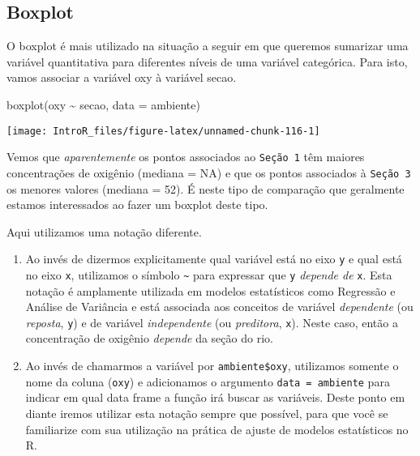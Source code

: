 \documentclass[
]{book}
\newenvironment{Shaded}{\begin{snugshade}}{\end{snugshade}}
\newcommand{\AttributeTok}[1]{\textcolor[rgb]{0.77,0.63,0.00}{#1}}
\newcommand{\FunctionTok}[1]{\textcolor[rgb]{0.00,0.00,0.00}{#1}}
\newcommand{\NormalTok}[1]{#1}
\newcommand{\SpecialCharTok}[1]{\textcolor[rgb]{0.00,0.00,0.00}{#1}}
\begin{document}
\hypertarget{boxplot-1}{%
\subsection{Boxplot}\label{boxplot-1}}

O boxplot é mais utilizado na situação a seguir em que queremos sumarizar uma variável quantitativa para diferentes níveis de uma variável categórica. Para isto, vamos associar a variável oxy à variável secao.

\begin{Shaded}
\begin{Highlighting}[]
\FunctionTok{boxplot}\NormalTok{(oxy }\SpecialCharTok{\textasciitilde{}}\NormalTok{ secao, }\AttributeTok{data =}\NormalTok{ ambiente)}
\end{Highlighting}
\end{Shaded}

\begin{center}\texttt{[image: IntroR\_files/figure-latex/unnamed-chunk-116-1]} \end{center}

Vemos que \emph{aparentemente} os pontos associados ao \texttt{Seção\ 1} têm maiores concentrações de oxigênio (mediana = NA) e que os pontos associados à \texttt{Seção\ 3} os menores valores (mediana = 52). É neste tipo de comparação que geralmente estamos interessados ao fazer um boxplot deste tipo.

Aqui utilizamos uma notação diferente.

\begin{enumerate}
\def\labelenumi{\arabic{enumi}.}
\item
  Ao invés de dizermos explicitamente qual variável está no eixo \texttt{y} e qual está no eixo \texttt{x}, utilizamos o símbolo \texttt{\textasciitilde{}} para expressar que \texttt{y} \emph{depende de} \texttt{x}. Esta notação é amplamente utilizada em modelos estatísticos como Regressão e Análise de Variância e está associada aos conceitos de variável \emph{dependente} (ou \emph{reposta}, \texttt{y}) e de variável \emph{independente} (ou \emph{preditora}, \texttt{x}). Neste caso, então a concentração de oxigênio \emph{depende} da seção do rio.
\item
  Ao invés de chamarmos a variável por \texttt{ambiente\$oxy}, utilizamos somente o nome da coluna (\texttt{oxy}) e adicionamos o argumento \texttt{data\ =\ ambiente} para indicar em qual data frame a função irá buscar as variáveis. Deste ponto em diante iremos utilizar esta notação sempre que possível, para que você se familiarize com sua utilização na prática de ajuste de modelos estatísticos no R.
\end{enumerate}
\end{document}
